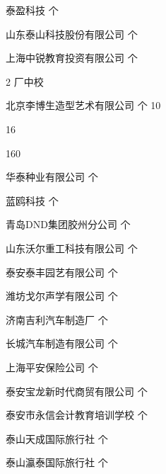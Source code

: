 泰盈科技
个





山东泰山科技股份有限公司
个





上海中锐教育投资有限公司
个



2
厂中校

北京李博生造型艺术有限公司
个
10

16



160%




华泰种业有限公司
个





蓝鸥科技
个





青岛DND集团胶州分公司
个





山东沃尔重工科技有限公司
个





泰安泰丰园艺有限公司
个





潍坊戈尔声学有限公司
个





济南吉利汽车制造厂
个





长城汽车制造有限公司
个





上海平安保险公司
个





泰安宝龙新时代商贸有限公司
个





泰安市永信会计教育培训学校
个





泰山天成国际旅行社
个





泰山瀛泰国际旅行社
个





